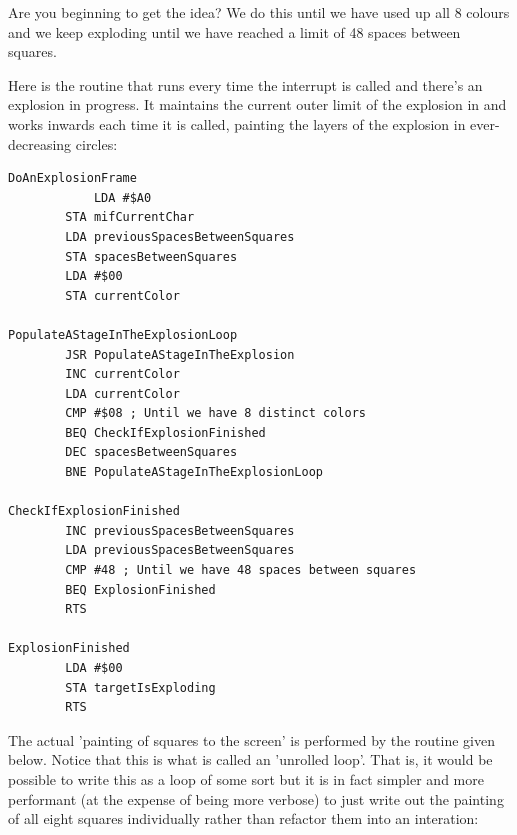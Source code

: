 Are you beginning to get the idea? We do this until we have used up all 8 colours and we keep exploding
until we have reached a limit of 48 spaces between squares. 

Here is the routine that runs every time the
interrupt is called and there's an explosion in progress. It maintains the current outer limit of the 
explosion in  and works inwards each time it is called, painting the
layers of the explosion in ever-decreasing circles:

\begin{lstlisting}[escapechar=\%, caption=The routine responsible for animating a frame of the explosion\, it will
keep getting called until it sets \icode{targetIsExploding} to \icode{\$00}.]
DoAnExplosionFrame
		    LDA #$A0
        STA mifCurrentChar
        LDA previousSpacesBetweenSquares
        STA spacesBetweenSquares
        LDA #$00
        STA currentColor

PopulateAStageInTheExplosionLoop   
        JSR PopulateAStageInTheExplosion
        INC currentColor
        LDA currentColor
        CMP #$08 ; Until we have 8 distinct colors
        BEQ CheckIfExplosionFinished
        DEC spacesBetweenSquares
        BNE PopulateAStageInTheExplosionLoop

CheckIfExplosionFinished   
        INC previousSpacesBetweenSquares
        LDA previousSpacesBetweenSquares
        CMP #48 ; Until we have 48 spaces between squares
        BEQ ExplosionFinished
        RTS 

ExplosionFinished   
        LDA #$00
        STA targetIsExploding
        RTS 

\end{lstlisting}

The actual 'painting of squares to the screen' is performed by the  routine
given below. Notice that this is what is called an 'unrolled loop'. That is, it would be possible to write this
as a loop of some sort but it is in fact simpler and more performant (at the expense of being more verbose) to just
write out the painting of all eight squares individually rather than refactor them into an interation:

